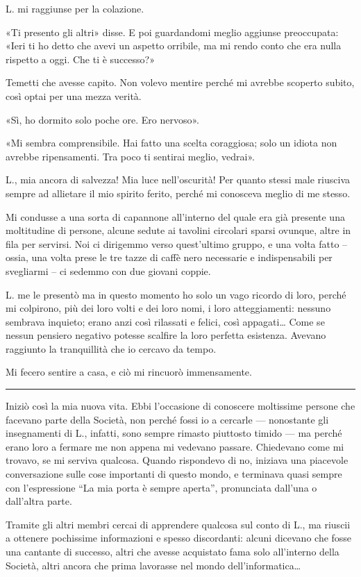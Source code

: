 L. mi raggiunse per la colazione.

«Ti presento gli altri» disse. E poi guardandomi meglio aggiunse preoccupata: «Ieri ti ho detto che
avevi un aspetto orribile, ma mi rendo conto che era nulla rispetto a oggi. Che ti è successo?»

Temetti che avesse capito. Non volevo mentire perché mi avrebbe scoperto subito, così optai per una
mezza verità.

«Sì, ho dormito solo poche ore. Ero nervoso».

«Mi sembra comprensibile. Hai fatto una scelta coraggiosa; solo un idiota non avrebbe ripensamenti.
Tra poco ti sentirai meglio, vedrai».

L., mia ancora di salvezza! Mia luce nell'oscurità! Per quanto stessi male riusciva sempre ad
allietare il mio spirito ferito, perché mi conosceva meglio di me stesso.

Mi condusse a una sorta di capannone all'interno del quale era già presente una moltitudine di
persone, alcune sedute ai tavolini circolari sparsi ovunque, altre in fila per servirsi. Noi ci
dirigemmo verso quest'ultimo gruppo, e una volta fatto -- ossia, una volta prese le tre tazze di
caffè nero necessarie e indispensabili per svegliarmi -- ci sedemmo con due giovani coppie.

L. me le presentò ma in questo momento ho solo un vago ricordo di loro, perché mi colpirono, più dei
loro volti e dei loro nomi, i loro atteggiamenti: nessuno sembrava inquieto; erano anzi così
rilassati e felici, così appagati\dots{} Come se nessun pensiero negativo potesse scalfire la loro
perfetta esistenza. Avevano raggiunto la tranquillità che io cercavo da tempo.

Mi fecero sentire a casa, e ciò mi rincuorò immensamente.

\plainbreak{1}

Iniziò così la mia nuova vita. Ebbi l'occasione di conoscere moltissime persone che facevano parte
della Società, non perché fossi io a cercarle --- nonostante gli insegnamenti di L., infatti, sono
sempre rimasto piuttosto timido --- ma perché erano loro a fermare me non appena mi vedevano
passare. Chiedevano come mi trovavo, se mi serviva qualcosa. Quando rispondevo di no, iniziava una
piacevole conversazione sulle cose importanti di questo mondo, e terminava quasi sempre con
l'espressione ``La mia porta è sempre aperta'', pronunciata dall'una o dall'altra parte.

Tramite gli altri membri cercai di apprendere qualcosa sul conto di L., ma riuscii a ottenere
pochissime informazioni e spesso discordanti: alcuni dicevano che fosse una cantante di successo,
altri che avesse acquistato fama solo all'interno della Società, altri ancora che prima lavorasse
nel mondo dell'informatica\dots{}

